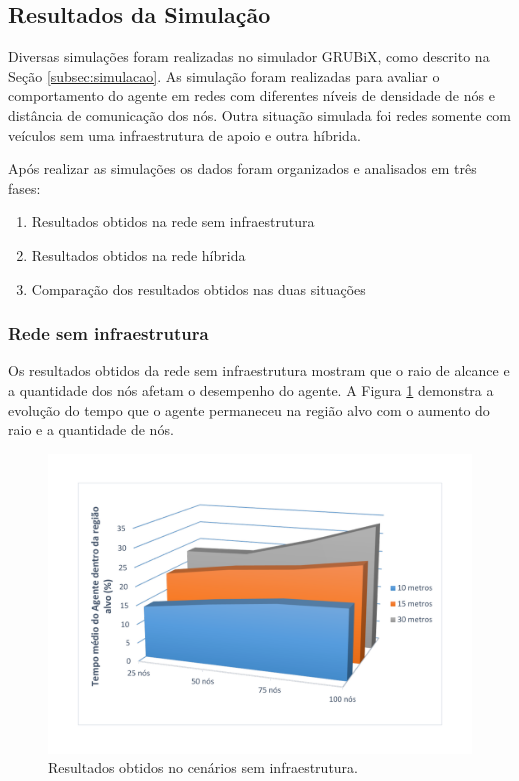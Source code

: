 	\subsection{Resultados da Simulação}
	\label{subsec:resultadoSimulacao}

	Diversas simulações foram realizadas no simulador GRUBiX, como descrito na Seção \ref{subsec:simulacao}. As simulação foram realizadas para avaliar o comportamento do agente em redes com diferentes níveis de densidade de nós e distância de comunicação dos nós. Outra situação simulada foi redes somente com veículos sem uma infraestrutura de apoio e outra híbrida.

	Após realizar as simulações os dados foram organizados e analisados em três fases:

	\begin{enumerate}
		\item Resultados obtidos na rede sem infraestrutura
		\item Resultados obtidos na rede híbrida
		\item Comparação dos resultados obtidos nas duas situações
	\end{enumerate} 

	\subsubsection{Rede sem infraestrutura}

	Os resultados obtidos da rede sem infraestrutura mostram que o raio de alcance e a quantidade dos nós afetam o desempenho do agente. A Figura \ref{fig:graficosSemTorres} demonstra a evolução do tempo que o agente permaneceu na região alvo com o aumento do raio e a quantidade de nós. 

	\begin{figure}[htbp]
		\centering
		\includegraphics[scale=0.34]{resultados/graficos/graficoSemTorres.pdf}
		\caption{Resultados obtidos no cenários sem infraestrutura.}
		\label{fig:graficosSemTorres}
	\end{figure}

